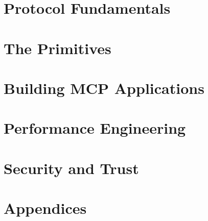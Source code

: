 \documentclass[11pt,twoside,openright]{book}
\begin{document}
\frontmatter



\tableofcontents




\mainmatter

\part{Protocol Fundamentals}





\part{The Primitives}







\part{Building MCP Applications}





\part{Performance Engineering}





\part{Security and Trust}





\appendix
\part{Appendices}







\backmatter

\end{document}
